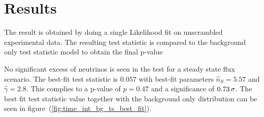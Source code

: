 \section{Results}
The result is obtained by doing a single Likelihood fit on unscrambled experimental data.
The resulting test statistic is compared to the background only test statistic model to obtain the final p-value

No significant excess of neutrinos is seen in the test for a steady state flux scenario.
The best-fit test statistic is $\num{0.057}$ with best-fit parameters $\hat{n}_S = \num{5.57}$ and $\hat{\gamma} = \num{2.8}$.
This complies to a p-value of $p=0.47$ and a significance of $\num{0.73}\,\sigma$.
The  best fit test statistic value together with the background only distribution can be seen in figure~(\ref{fig:time_int_bg_ts_best_fit}).



